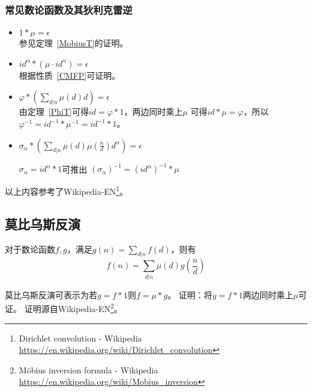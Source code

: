 \subsubsection{常见数论函数及其狄利克雷逆}
\begin{itemize}
	\item $1*\mu=\epsilon$\\
	      参见定理~\ref{MobiusT}的证明。
	\item $id^\alpha*(\mu\cdot id^\alpha)=\epsilon$\\
	      根据性质~\ref{CMFP}可证明。
	\item $\displaystyle \varphi*(\sum_{d|n}{\mu(d)d})=\epsilon$\\
	      由定理~\ref{PhiT}可得$id=\varphi*1$，两边同时乘上$\mu$
	      可得$id*\mu=\varphi$，所以$\varphi^{-1}=id^{-1}*\mu^{-1}=id^{-1}*1$。
	\item $\sigma_\alpha*(\sum_{d|n}{\mu(d)\mu(\frac{n}{d})d^\alpha})=\epsilon$

	      $\sigma_\alpha=id^\alpha*1$可推出
	      $(\sigma_\alpha)^{-1}=(id^\alpha)^{-1}*\mu$
\end{itemize}
以上内容参考了Wikipedia-EN\footnote{Dirichlet convolution - Wikipedia\\
	\url{https://en.wikipedia.org/wiki/Dirichlet\_convolution}}。
\subsection{莫比乌斯反演}
\begin{theorem}
	对于数论函数$f,g$，满足$\displaystyle g(n)=\sum_{d|n}f(d)$，则有
	\begin{displaymath}
		f(n)=\sum_{d|n}\mu(d)g(\frac{n}{d})
	\end{displaymath}
\end{theorem}
莫比乌斯反演可表示为若$g=f*1$则$f=\mu*g$。
证明：将$g=f*1$两边同时乘上$\mu$可证。
证明源自Wikipedia-EN\footnote{Möbius inversion formula - Wikipedia\\
	\url{https://en.wikipedia.org/wiki/Mobius_inversion}}。
